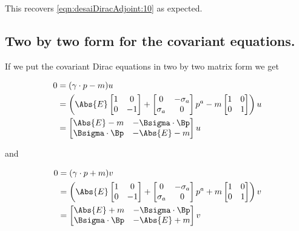 This recovers \ref{eqn:desaiDiracAdjoint:10} as expected.

\subsection{Two by two form for the covariant equations.}

If we put the covariant Dirac equations in two by two matrix form we get

\begin{align*}
0
&= 
(\gamma \cdot p - m ) u \\
&= 
\left(
\Abs{E} 
\begin{bmatrix}
1 & 0 \\
0 & -1 
\end{bmatrix}
+ 
\begin{bmatrix}
0 & - \sigma_a \\
\sigma_a & 0
\end{bmatrix}
p^a
- m
\begin{bmatrix}
1 & 0 \\
0 & 1 
\end{bmatrix}
\right) u \\
&=
\begin{bmatrix}
\Abs{E} - m & - \Bsigma \cdot \Bp \\
\Bsigma \cdot \Bp & -\Abs{E} - m
\end{bmatrix} u
\end{align*}

and

\begin{align*}
0 &= (\gamma \cdot p + m ) v \\
&= 
\left(
\Abs{E} 
\begin{bmatrix}
1 & 0 \\
0 & -1 
\end{bmatrix}
+ 
\begin{bmatrix}
0 & - \sigma_a \\
\sigma_a & 0
\end{bmatrix}
p^a
+ m
\begin{bmatrix}
1 & 0 \\
0 & 1 
\end{bmatrix}
\right) v \\
&=
\begin{bmatrix}
\Abs{E} + m & - \Bsigma \cdot \Bp \\
\Bsigma \cdot \Bp & -\Abs{E} + m
\end{bmatrix} v
\end{align*}

